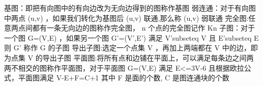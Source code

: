 \markdownRendererDocumentBegin
\markdownRendererSectionBegin
\markdownRendererSectionBegin
{}\markdownRendererInterblockSeparator
{}基图：即把有向图中的有向边改为无向边得到的图称作基图\markdownRendererParagraphSeparator
{}弱连通：对于有向图中两点\markdownRendererDollarSign{} (u,v) \markdownRendererDollarSign{}，如果我们转化为基图后\markdownRendererDollarSign{} (u,v) \markdownRendererDollarSign{}联通,那么称\markdownRendererDollarSign{} (u,v) \markdownRendererDollarSign{}弱联通\markdownRendererParagraphSeparator
{}完全图:任意两点间都有一条无向边的图称作完全图，\markdownRendererDollarSign{} n \markdownRendererDollarSign{}个点的完全图记作\markdownRendererDollarSign{} K\markdownRendererUnderscore{}\markdownRendererLeftBrace{}n\markdownRendererRightBrace{} \markdownRendererDollarSign{}\markdownRendererParagraphSeparator
{}子图：对于一个图\markdownRendererDollarSign{} G=(V,E) \markdownRendererDollarSign{}，如果另一个图\markdownRendererDollarSign{} G\markdownRendererCircumflex{}\markdownRendererLeftBrace{}'\markdownRendererRightBrace{}=(V\markdownRendererCircumflex{}\markdownRendererLeftBrace{}'\markdownRendererRightBrace{},E\markdownRendererCircumflex{}\markdownRendererLeftBrace{}'\markdownRendererRightBrace{}) \markdownRendererDollarSign{}满足\markdownRendererDollarSign{} V\markdownRendererCircumflex{}\markdownRendererLeftBrace{}'\markdownRendererRightBrace{}\markdownRendererBackslash{}subseteq V \markdownRendererDollarSign{}且\markdownRendererDollarSign{} E\markdownRendererCircumflex{}\markdownRendererLeftBrace{}'\markdownRendererRightBrace{}\markdownRendererBackslash{}subseteq E \markdownRendererDollarSign{}则\markdownRendererDollarSign{} G\markdownRendererCircumflex{}\markdownRendererLeftBrace{}'\markdownRendererRightBrace{} \markdownRendererDollarSign{}称作\markdownRendererDollarSign{} G \markdownRendererDollarSign{}的子图\markdownRendererParagraphSeparator
{}导出子图:选定一个点集\markdownRendererDollarSign{} V \markdownRendererDollarSign{}，再加上两端都在\markdownRendererDollarSign{} V \markdownRendererDollarSign{}中的边，即为点集\markdownRendererDollarSign{} V \markdownRendererDollarSign{}的导出子图\markdownRendererParagraphSeparator
{}平面图:将所有点和边铺在平面上，可以满足每条边之间两两不相交的图称作平面图，对于平面图\markdownRendererDollarSign{} G=(V,E) \markdownRendererDollarSign{}满足\markdownRendererDollarSign{} E<=3V-6 \markdownRendererDollarSign{} 且根据欧拉公式，平面图满足\markdownRendererDollarSign{} V-E+F=C+1 \markdownRendererDollarSign{}其中\markdownRendererDollarSign{} F \markdownRendererDollarSign{}是面的个数,\markdownRendererDollarSign{} C \markdownRendererDollarSign{}是图连通块的个数\markdownRendererInterblockSeparator
